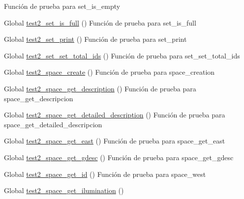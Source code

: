 \begin{DoxyRefList}
%
Función de prueba para set\+\_\+is\+\_\+empty  
\item[Global \mbox{\hyperlink{set__test_8c_ab1de430f3e313725897f9b0b1aba543b}{test2\+\_\+set\+\_\+is\+\_\+full}} ()]\label{test__test000236}%
%
Función de prueba para set\+\_\+is\+\_\+full  
\item[Global \mbox{\hyperlink{set__test_8c_a41ec3a4fd0af7d960f6b80561f9fec08}{test2\+\_\+set\+\_\+print}} ()]\label{test__test000240}%
%
Función de prueba para set\+\_\+print  
\item[Global \mbox{\hyperlink{set__test_8c_ae5a36a5b714609cd8b4beaad7af58be5}{test2\+\_\+set\+\_\+set\+\_\+total\+\_\+ids}} ()]\label{test__test000220}%
%
Función de prueba para set\+\_\+set\+\_\+total\+\_\+ids  
\item[Global \mbox{\hyperlink{space__test_8c_a012cd3cf37a8d91e2d7098a264c29d65}{test2\+\_\+space\+\_\+create}} ()]\label{test__test000245}%
%
Función de prueba para space\+\_\+creation  
\item[Global \mbox{\hyperlink{space__test_8c_aebfa57e927e8f871e73425975c11976b}{test2\+\_\+space\+\_\+get\+\_\+description}} ()]\label{test__test000286}%
%
Función de prueba para space\+\_\+get\+\_\+descripcion  
\item[Global \mbox{\hyperlink{space__test_8c_a203ae537947dd6fc7ce848a7a5b3c28e}{test2\+\_\+space\+\_\+get\+\_\+detailed\+\_\+description}} ()]\label{test__test000296}%
%
Función de prueba para space\+\_\+get\+\_\+detailed\+\_\+descripcion  
\item[Global \mbox{\hyperlink{space__test_8c_a249293510e61c6d5465f52c14343d02b}{test2\+\_\+space\+\_\+get\+\_\+east}} ()]\label{test__test000268}%
%
Función de prueba para space\+\_\+get\+\_\+east  
\item[Global \mbox{\hyperlink{space__test_8c_a3422f19fd8a821a06ccba2feb52034c2}{test2\+\_\+space\+\_\+get\+\_\+gdesc}} ()]\label{test__test000281}%
%
Función de prueba para space\+\_\+get\+\_\+gdesc  
\item[Global \mbox{\hyperlink{space__test_8c_af9087176b0d3c41d83a17a4918b13e31}{test2\+\_\+space\+\_\+get\+\_\+id}} ()]\label{test__test000258}%
%
Función de prueba para space\+\_\+west  
\item[Global \mbox{\hyperlink{space__test_8c_a53dfd88fd3b4ee6cf54e25b3d0aa7d1f}{test2\+\_\+space\+\_\+get\+\_\+ilumination}} ()]\label{test__test000291}%

\end{DoxyRefList}
